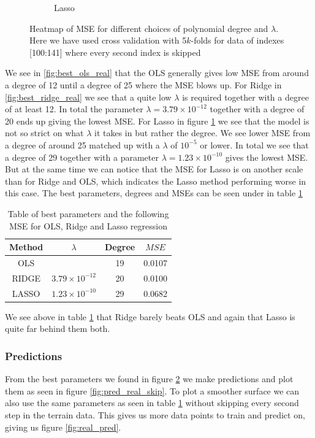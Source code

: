 \documentclass[12pt]{article}
\begin{document}
\begin{figure}[H]
\begin{subfigure}{.5\textwidth}
    \caption{Lasso}
    \label{fig:best_lasso_real}
  \end{subfigure}
  \caption{Heatmap of MSE for different choices of polynomial degree and $\lambda$. Here we have used cross validation with 5$k$-folds for data of indexes [100:141] where every second index is skipped}
  \label{fig:heat_real}
\end{figure}
We see in \ref{fig:best_ols_real} that the OLS generally gives low MSE from around a degree of 12 until a degree of 25 where the MSE blows up. For Ridge in \ref{fig:best_ridge_real} we see that a quite low $\lambda$ is required together with a degree of at least 12. In total the parameter $\lambda =3.79 \times 10^{-12}$ together with a degree of 20 ends up giving the lowest MSE. For Lasso in figure \ref{fig:best_lasso_real} we see that the model is not so strict on what $\lambda$ it takes in but rather the degree. We see lower MSE from a degree of around 25 matched up with a $\lambda$ of $10^{-5}$ or lower. In total we see that a degree of 29 together with a parameter $\lambda=1.23\times10^{-10}$ gives the lowest MSE. But at the same time we can notice that the MSE for Lasso is on another scale than for Ridge and OLS, which indicates the Lasso method performing worse in this case. The best parameters, degrees and MSEs can be seen under in table \ref{tab:best_comp_real}
\begin{table}[H]
  \centering
  \caption{Table of best parameters and the following MSE for OLS, Ridge and Lasso regression}
  \label{tab:best_comp_real}
  \begin{tabular}{|c||c|c|c|}
    \hline
    Method & $\lambda$ & Degree & $MSE$ \\
    \hline
    OLS &  & 19 & 0.0107 \\
    \hline
    RIDGE & $3.79\times10^{-12}$ & 20 & 0.0100 \\
    \hline
    LASSO & $1.23\times10^{-10}$ & 29 & 0.0682 \\
    \hline
  \end{tabular}
\end{table}
We see above in table \ref{tab:best_comp_real} that Ridge barely beats OLS and again that Lasso is quite far behind them both.
\subsubsection{Predictions}
From the best parameters we found in figure \ref{fig:heat_real} we make predictions and plot them as seen in figure \ref{fig:pred_real_skip}. To plot a smoother surface we can also use the same parameters as seen in table \ref{tab:best_comp_real} without skipping every second step in the terrain data. This gives us more data points to train and predict on, giving us figure \ref{fig:real_pred}.
\end{document}
